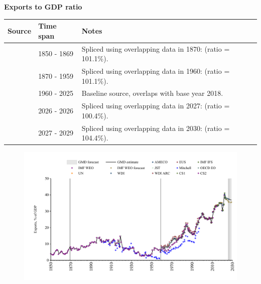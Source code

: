\documentclass[12pt,a4paper,landscape]{article}
\begin{document}
\begin{adjustbox}{max totalsize={\paperwidth}{\paperheight},center}
\begin{minipage}[t][\textheight][t]{\textwidth}
\vspace*{0.5cm}
{}
\begin{center}
{\Large\bfseries Exports to GDP ratio}
\end{center}
\vspace{0.5cm}
\begin{table}[H]
\centering
\small
\begin{tabular}{|l|l|l|}
\hline
\textbf{Source} & \textbf{Time span} & \textbf{Notes} \\
\hline
\rowcolor{white}\cite{CS2_ESP}& 1850 - 1869 &Spliced using overlapping data in 1870: (ratio = 101.1\%). \\
\rowcolor{lightgray}\cite{JST}& 1870 - 1959 &Spliced using overlapping data in 1960: (ratio = 101.1\%). \\
\rowcolor{white}\cite{OECD_EO}& 1960 - 2025 &Baseline source, overlaps with base year 2018. \\
\rowcolor{lightgray}\cite{AMECO}& 2026 - 2026 &Spliced using overlapping data in 2027: (ratio = 100.4\%). \\
\rowcolor{white}\cite{IMF_WEO_forecast}& 2027 - 2029 &Spliced using overlapping data in 2030: (ratio = 104.4\%). \\
\hline
\end{tabular}
\end{table}
\begin{figure}[H]
\centering
\includegraphics[width=\textwidth,height=0.6\textheight,keepaspectratio]{graphs/ESP_exports_GDP.pdf}
\end{figure}
\end{minipage}
\end{adjustbox}
\end{document}

